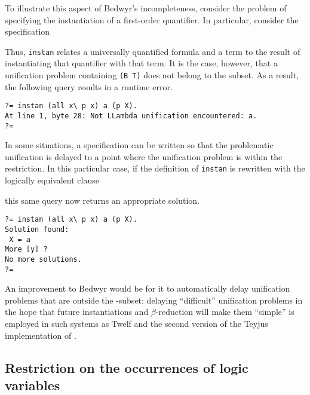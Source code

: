 To illustrate this aspect of Bedwyr's incompleteness, consider the problem of
specifying the instantiation of a first-order quantifier.  In particular,
consider the specification
\begin{center}\end{center}
Thus, \lstinline{instan} relates a universally quantified formula and a term
to the result of instantiating that quantifier with that term.  It is the
case, however, that a unification problem containing \lstinline{(B T)} does
not belong to the \Ll{} subset.  As a result, the following query results in a
runtime error.
\begin{center}\begin{lstlisting}[style=bedwyr-repl]
?= instan (all x\ p x) a (p X).
At line 1, byte 28: Not LLambda unification encountered: a.
?=
\end{lstlisting}\end{center}
In some situations, a specification can be written so that the problematic
unification is delayed to a point where the unification problem is within the
\Ll{} restriction.  In this particular case, if the definition of
\lstinline{instan} is rewritten with the logically equivalent clause
\begin{center}\end{center}
this same query now returns an appropriate solution.
\begin{center}\begin{lstlisting}[style=bedwyr-repl]
?= instan (all x\ p x) a (p X).
Solution found:
 X = a
More [y] ?
No more solutions.
?=
\end{lstlisting}\end{center}
An improvement to Bedwyr would be for it to automatically delay unification
problems that are outside the \Ll{}-subset: delaying ``difficult'' unification
problems in the hope that future instantiations and $\beta$-reduction will
make them ``simple'' is employed in such systems as Twelf and the second
version of the Teyjus implementation of \lp{} \cite{teyjus.website}.

\subsection{Restriction on the occurrences of logic variables}
\label{restrict-logic-variables}

